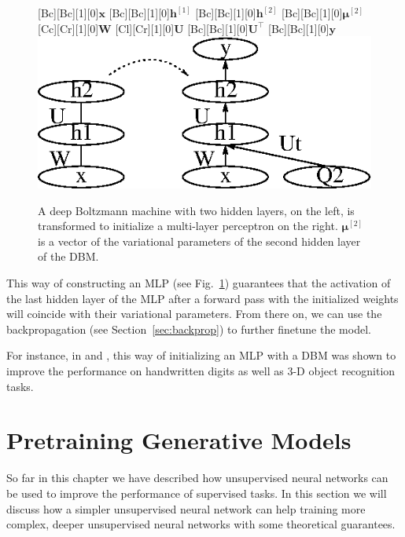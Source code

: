 \documentclass[dissertation,nocontribution,draft*]{aaltoseries}
\newcommand{\qlay}[1]{\left[#1\right]}
\newcommand{\vect}[1]{\mathbf{#1}}
\newcommand{\vects}[1]{\boldsymbol{#1}}
\newcommand{\matr}[1]{\mathbf{#1}}
\newcommand{\vh}[0]{\vect{h}}
\newcommand{\vx}[0]{\vect{x}}
\newcommand{\vy}[0]{\vect{y}}
\newcommand{\mW}[0]{\matr{W}}
\newcommand{\mU}[0]{\matr{U}}
\newcommand{\vmu}[0]{\vects{\mu}}
\begin{document}
\begin{figure}[t]
    \centering
    [Bc][Bc][1][0]{$\vx$}
    [Bc][Bc][1][0]{$\vh^{\qlay{1}}$}
    [Bc][Bc][1][0]{$\vh^{\qlay{2}}$}
    [Bc][Bc][1][0]{$\vmu^{\qlay{2}}$}
    [Cc][Cr][1][0]{$\mW$}
    [Cl][Cr][1][0]{$\mU$}
    [Bc][Bc][1][0]{$\mU^\top$}
    [Bc][Bc][1][0]{$\vy$}
    \includegraphics[width=0.75\columnwidth]{figures/dbm_mlp.eps}
    \caption{A deep Boltzmann machine with two hidden
    layers, on the left, is transformed to initialize a
    multi-layer perceptron on the right. $\vmu^{\qlay{2}}$ is a
    vector of the variational parameters of the second
    hidden layer of the DBM.}
    \label{fig:dbm_mlp}
\end{figure}

This way of constructing an MLP (see Fig.~\ref{fig:dbm_mlp})
guarantees that the activation of the last hidden layer of
the MLP after a forward pass with the initialized weights
will coincide with their variational parameters. From there
on, we can use the backpropagation (see
Section~\ref{sec:backprop}) to further finetune the model.

For instance, in \citep{Salakhutdinov2009a} and
\citep{Hinton2012}, this way of initializing an MLP with a
DBM was shown to improve the performance on handwritten
digits as well as 3-D object recognition tasks.





\section{Pretraining Generative Models}
\label{sec:pretrain_gen}


So far in this chapter we have described how 
unsupervised neural networks can be used to improve the
performance of supervised tasks. In this section we will
discuss how a simpler unsupervised neural network can help
training more complex, deeper unsupervised neural networks
with some theoretical guarantees.
\end{document}
